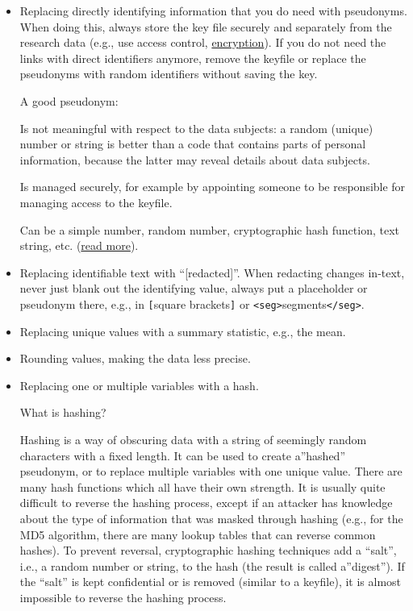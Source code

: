 \documentclass[
]{book}
\providecommand{\tightlist}{%
  \setlength{\itemsep}{0pt}\setlength{\parskip}{0pt}}
\begin{document}
\begin{itemize}
\tightlist
\item
  Replacing directly identifying information that you do need with pseudonyms.
  When doing this, always store the key file securely and separately from the
  research data (e.g., use access control, \protect\hyperlink{encryption}{encryption}). If you
  do not need the links with direct identifiers anymore, remove the keyfile or
  replace the pseudonyms with random identifiers without saving the key.

  A good pseudonym:

  Is not meaningful with respect to the data subjects: a random (unique)
  number or string is better than a code that contains parts of personal
  information, because the latter may reveal details about data subjects.

  Is managed securely, for example by appointing someone to be responsible
  for managing access to the keyfile.

  Can be a simple number, random number, cryptographic hash function, text
  string, etc.
  (\href{https://www.enisa.europa.eu/publications/pseudonymisation-techniques-and-best-practices}{read more}).
\item
  Replacing identifiable text with ``{[}redacted{]}''. When redacting changes in-text,
  never just blank out the identifying value, always put a placeholder or
  pseudonym there, e.g., in \texttt{{[}}square brackets\texttt{{]}} or \texttt{\textless{}seg\textgreater{}}segments\texttt{\textless{}/seg\textgreater{}}.
\item
  Replacing unique values with a summary statistic, e.g., the mean.
\item
  Rounding values, making the data less precise.
\item
  Replacing one or multiple variables with a hash.

  What is hashing?

  Hashing is a way of obscuring data with a string of seemingly random
  characters with a fixed length. It can be used to create a''hashed'' pseudonym, or
  to replace multiple variables with one unique value. There are many hash
  functions which all have their own strength. It is usually quite difficult to
  reverse the hashing process, except if an attacker has knowledge about the type
  of information that was masked through hashing (e.g., for the MD5 algorithm,
  there are many lookup tables that can reverse common hashes). To prevent
  reversal, cryptographic hashing techniques add a ``salt'', i.e., a random number
  or string, to the hash (the result is called a''digest''). If the ``salt'' is kept
  confidential or is removed (similar to a keyfile), it is almost impossible to
  reverse the hashing process.
\end{itemize}
\end{document}
